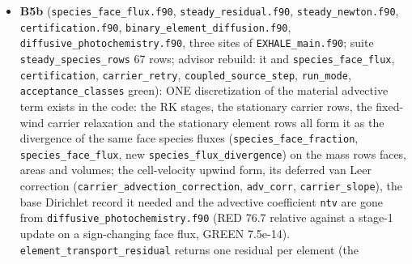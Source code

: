 \documentclass[english,a4paper]{my_memo}
\begin{document}
\begin{itemize}
  oxygen balances as rows all 41 colors came back unresolved). \texttt{wasp\_full\_newton}
  stays certified (13.30, byte-identical); H2-only control byte-identical;
  marching path byte-identical (\texttt{wasp\_full}, \texttt{mol\_base\_handoff} 300).
  \textbf{Findings:} no regression case enters the steady solver, so every golden
  is a marching snapshot and \texttt{cert\_tol\_carrier}/\texttt{cert\_tol\_element} still
  have no anchor (contract section 11 records two rows from solves that did
  not meet their target, 7.46e-3 and 5.82e-3, not anchors). \textbf{Open, and a
  physical-consistency defect:} the stationary carrier row still uses the
  cell-velocity advective form while the marching rows ride on
  \texttt{F\_rho\ Y\_s\^{}face\ /\ m\_s} since B4-1c (two operators, two fixed points): B5b.
  Also open: the element rows (\texttt{element\_transport\_residual} must return a
  residual per element, not the worst at each cell), the cell\textquotesingle s own field
  in the cell residual (interface written: FIELD-SELF), reload consistency,
  three \texttt{EXHALE\_main.f90} sites (the registry name, \texttt{EXHALE\_JAC\_TEST}
  coverage, the PTC refusal text).
\item
  \textbf{B5b} (\texttt{species\_face\_flux.f90}, \texttt{steady\_residual.f90}, \texttt{steady\_newton.f90},
  \texttt{certification.f90}, \texttt{binary\_element\_diffusion.f90},
  \texttt{diffusive\_photochemistry.f90}, three sites of \texttt{EXHALE\_main.f90}; suite
  \texttt{steady\_species\_rows} 67 rows; advisor rebuild: it and \texttt{species\_face\_flux},
  \texttt{certification}, \texttt{carrier\_retry}, \texttt{coupled\_source\_step}, \texttt{run\_mode},
  \texttt{acceptance\_classes} green): ONE discretization of the material advective
  term exists in the code: the RK stages, the stationary carrier rows, the
  fixed-wind carrier relaxation and the stationary element rows all form it
  as the divergence of the same face species fluxes (\texttt{species\_face\_fraction},
  \texttt{species\_face\_flux}, new \texttt{species\_flux\_divergence}) on the mass row\textquotesingle s faces,
  areas and volumes; the cell-velocity upwind form, its deferred van Leer
  correction (\texttt{carrier\_advection\_correction}, \texttt{adv\_corr}, \texttt{carrier\_slope}), the
  base Dirichlet record it needed and the advective coefficient \texttt{ntv} are
  gone from \texttt{diffusive\_photochemistry.f90} (RED 76.7 relative against a
  stage-1 update on a sign-changing face flux, GREEN 7.5e-14).
  \texttt{element\_transport\_residual} returns one residual per element (the

\end{itemize}
\end{document}
